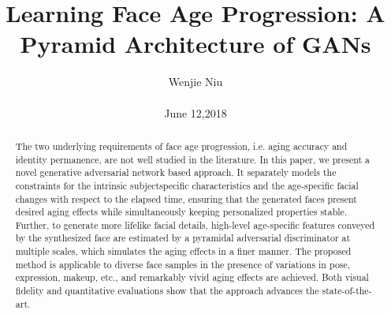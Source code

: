\documentclass[10pt,twocolumn,letterpaper]{article}
\begin{document}
\title{Learning Face Age Progression: A Pyramid Architecture of GANs}

\author{Wenjie Niu\\\\ June 12,2018}

\maketitle

\begin{abstract}
  \cite{Yang_2018_CVPR}The two underlying requirements of face age progression,
i.e. aging accuracy and identity permanence, are not
well studied in the literature. In this paper, we present a
novel generative adversarial network based approach. It
separately models the constraints for the intrinsic subjectspecific
characteristics and the age-specific facial changes
with respect to the elapsed time, ensuring that the generated
faces present desired aging effects while simultaneously
keeping personalized properties stable. Further, to
generate more lifelike facial details, high-level age-specific
features conveyed by the synthesized face are estimated by
a pyramidal adversarial discriminator at multiple scales,
which simulates the aging effects in a finer manner. The
proposed method is applicable to diverse face samples in
the presence of variations in pose, expression, makeup, etc.,
and remarkably vivid aging effects are achieved. Both visual
fidelity and quantitative evaluations show that the approach
advances the state-of-the-art.\par
\end{abstract}

\end{document}
